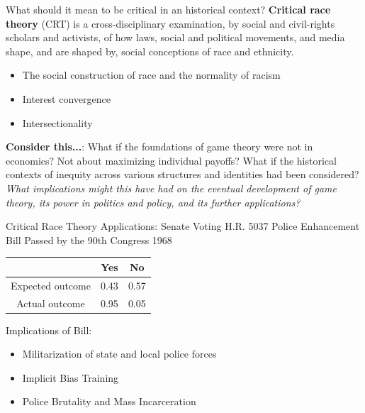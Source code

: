\documentclass[10pt]{beamer} %
\theoremstyle{plain} %
\theoremstyle{definition} %
\begin{document}

\begin{frame}{\color{Maroon} What should it mean to be critical in an historical context?}
\noindent \textbf{Critical race theory} (CRT) is a cross-disciplinary examination, by social and civil-rights scholars and activists, of how laws, social and political movements, and media shape, and are shaped by, social conceptions of race and ethnicity.

\begin{itemize}
\item The social construction of race and the normality of racism
\item Interest convergence
\item Intersectionality
\end{itemize}

\vfill

\textbf{Consider this...}: What if the foundations of game theory were not in economics? Not about maximizing individual payoffs? What if the historical contexts of inequity across various structures and identities had been considered? \textit{What implications might this have had on the eventual development of game theory, its power in politics and policy, and its further applications?}

\vfill

\end{frame}




\begin{frame}{\color{Maroon} Critical Race Theory Applications: Senate Voting}
\noindent H.R. 5037 Police Enhancement Bill Passed by the 90th Congress 1968 \\
\begin{center}
\begin{tabular}{ |c|c|c| } 
 \hline
 & Yes & No \\ 
 \hline
 Expected outcome & 0.43 & 0.57 \\ 
 \hline
Actual outcome & 0.95 & 0.05 \\ 
 \hline
\end{tabular}
\end{center}
\vfill
Implications of Bill:
\begin{itemize}
    \item Militarization of state and local police forces
    \item Implicit Bias Training
    \item Police Brutality and Mass Incarceration
\end{itemize}

\end{frame}
\end{document}
